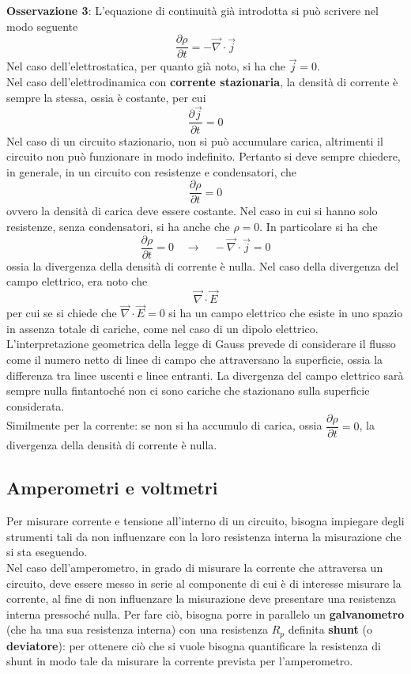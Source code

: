 \documentclass[a4paper]{extarticle}
\begin{document}
\vspace{2em}
\noindent
\textbf{Osservazione 3}: L'equazione di continuità già introdotta si può scrivere nel modo seguente
\[\dfrac{\partial \rho}{\partial t} = - \vec \nabla \cdot \vec j\]
Nel caso dell'elettrostatica, per quanto già noto, si ha che $\vec j = 0$.\\
Nel caso dell'elettrodinamica con \textbf{corrente stazionaria}, la densità di corrente è sempre la stessa, ossia è costante, per cui
\[\dfrac{\partial \vec j}{\partial t} = 0\]
Nel caso di un circuito stazionario, non si può accumulare carica, altrimenti il circuito non può funzionare in modo indefinito. Pertanto si deve sempre chiedere, in generale, in un circuito con resistenze e condensatori, che
\[\dfrac{\partial \rho}{\partial t} = 0\]
ovvero la densità di carica deve essere costante. Nel caso in cui si hanno solo resistenze, senza condensatori, si ha anche che $\rho=0$. In particolare si ha che
\[\dfrac{\partial \rho}{\partial t} = 0 \hspace{1em} \rightarrow \hspace{1em} -\vec \nabla \cdot \vec j = 0\]
ossia la divergenza della densità di corrente è nulla. Nel caso della divergenza del campo elettrico, era noto che
\[\vec \nabla \cdot \vec E\]
per cui se si chiede che $\vec \nabla \cdot \vec E=0$ si ha un campo elettrico che esiste in uno spazio in assenza totale di cariche, come nel caso di un dipolo elettrico.\\
L'interpretazione geometrica della legge di Gauss prevede di considerare il flusso come il numero netto di linee di campo che attraversano la superficie, ossia la differenza tra linee uscenti e linee entranti. La divergenza del campo elettrico sarà sempre nulla fintantoché non ci sono cariche che stazionano sulla superficie considerata.\\
Similmente per la corrente: se non si ha accumulo di carica, ossia $\dfrac{\partial \rho}{\partial t} = 0$, la divergenza della densità di corrente è nulla.


\vspace{1em}
\subsection{Amperometri e voltmetri}
Per misurare corrente e tensione all'interno di un circuito, bisogna impiegare degli strumenti tali da non influenzare con la loro resistenza interna la misurazione che si sta eseguendo.\\
Nel caso dell'amperometro, in grado di misurare la corrente che attraversa un circuito, deve essere messo in serie al componente di cui è di interesse misurare la corrente, al fine di non influenzare la misurazione deve presentare una resistenza interna pressoché nulla. Per fare ciò, bisogna porre in parallelo un \textbf{galvanometro} (che ha una sua resistenza interna) con una resistenza $R_p$ definita \textbf{shunt} (o \textbf{deviatore}): per ottenere ciò che si vuole bisogna quantificare la resistenza di shunt in modo tale da misurare la corrente prevista per l'amperometro.\\
\end{document}

